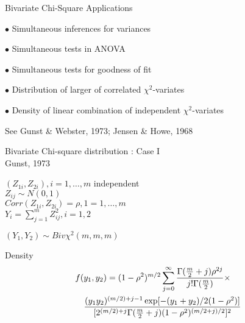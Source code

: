 \documentclass{slides}
\begin{document}
\begin{slide}
\begin{center}
Bivariate Chi-Square Applications
\end{center}

$\bullet$ Simultaneous inferences for variances

$\bullet$ Simultaneous tests in ANOVA

$\bullet$ Simultaneous tests for goodness of fit

$\bullet$ Distribution of larger of correlated $\chi^2$-variates

$\bullet$ Density of linear combination of independent $\chi^2$-variates

See Gunst \& Webster, 1973; Jensen \& Howe, 1968

\end{slide}
\begin{slide}
\begin{center}
Bivariate Chi-square distribution : Case I \\
Gunst, 1973 
\end{center}
$(Z_{1i}, Z_{2i}), i = 1,\ldots,m $ independent \\
$Z_{ij} \sim N(0,1)$ \\
$Corr(Z_{1i},Z_{2i}) = \rho, 1=1,\ldots, m$ \\
$Y_i = \sum_{j=1}^m Z_{ij}^2, i=1,2$ 

$(Y_1, Y_2) \sim Biv \chi^2(m,m,m)$

Density \\
\begin{eqnarray*}
\lefteqn{f(y_1, y_2) = 
  (1-\rho ^2)^{m/2} \sum_{j=0}^\infty \frac{\Gamma (\frac{m}{2}+j)
  \rho^{2j} }{j! \Gamma (\frac{m}{2})} \times } \\
 & & \frac{ (y_1 y_2)^{(m/2)+j-1} \exp [ -(y_1 + y_2) / 2(1-\rho^2)] }
          { [ 2^{(m/2)+j} \Gamma(\frac{m}{2}+j) (1-\rho^2)^{(m/2+j)/2}]^2 }
\end{eqnarray*}
\end{slide}
\end{document}
